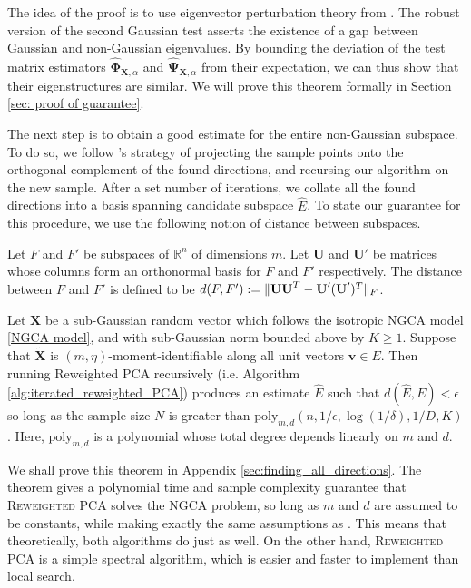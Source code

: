 \documentclass[final,12pt]{colt2018} %
\numberwithin{equation}{section}
\DeclarePairedDelimiter{\norm}{\lVert}{\rVert}
\newcommand{\R}{\mathbb{R}}
\newcommand{\boldv}{\textbf{v}}
\newcommand{\boldPhi}{\boldsymbol{\Phi}}
\newcommand{\boldPsi}{\boldsymbol{\Psi}}
\newcommand{\boldX}{\textbf{X}}
\begin{document}
The idea of the proof is to use eigenvector perturbation theory from \cite{Davis1970a}. The robust version of the second Gaussian test asserts the existence of a gap between Gaussian and non-Gaussian eigenvalues. By bounding the deviation of the test matrix estimators $\hat{\boldPhi}_{\boldX,\alpha}$ and $\hat{\boldPsi}_{\boldX,\alpha}$ from their expectation, we can thus show that their eigenstructures are similar. We will prove this theorem formally in Section \ref{sec: proof of guarantee}.

The next step is to obtain a good estimate for the entire non-Gaussian subspace. To do so, we follow \cite{Vempala2011}'s strategy of projecting the sample points onto the orthogonal complement of the found directions, and recursing our algorithm on the new sample. After a set number of iterations, we collate all the found directions into a basis spanning candidate subspace $\hat{E}$. To state our guarantee for this procedure, we use the following notion of distance between subspaces.

\begin{definition}
	Let $F$ and $F'$ be subspaces of $\R^n$ of dimensions $m$. Let $\textbf{U}$ and $\textbf{U}'$ be matrices whose columns form an orthonormal basis for $F$ and $F'$ respectively. The distance between $F$ and $F'$ is defined to be $d(F,F') := \norm{\textbf{U}\textbf{U}^T-\textbf{U}'(\textbf{U}')^T}_F$.
\end{definition}

\begin{theorem} \label{thm:finding_all_directions}
	Let $\boldX$ be a sub-Gaussian random vector which follows the isotropic NGCA model \eqref{NGCA model}, 
	and with sub-Gaussian norm bounded above by $K \geq 1$. Suppose that $\tilde{\boldX}$ is $(m,\eta)$-moment-identifiable along all unit vectors $\boldv \in E$. Then running {\textsc Reweighted PCA} recursively (i.e. Algorithm \ref{alg:iterated_reweighted_PCA}) produces an estimate $\hat{E}$ such that $d(\hat{E},E) < \epsilon$ so long as the sample size $N$ is greater than $\text{poly}_{m,d}(n,1/\epsilon,\log(1/\delta),1/D,K)$. Here, $\text{poly}_{m,d}$ is a polynomial whose total degree depends linearly on $m$ and $d$. 
\end{theorem}

We shall prove this theorem in Appendix \ref{sec:finding_all_directions}. The theorem gives a polynomial time and sample complexity guarantee that \textsc{Reweighted PCA} solves the NGCA problem, so long as $m$ and $d$ are assumed to be constants, while making exactly the same assumptions as \cite{Vempala2011}. This means that theoretically, both algorithms do just as well. On the other hand, \textsc{Reweighted PCA} is a simple spectral algorithm, which is easier and faster to implement than local search.
\end{document}
